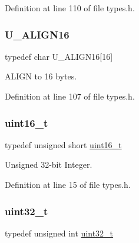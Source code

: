 Definition at line 110 of file types.\+h.

\mbox{\label{a00140_a9093ff6c6894ca213db42a2d686d0ad6_a9093ff6c6894ca213db42a2d686d0ad6}} 
\subsubsection{\texorpdfstring{U\+\_\+\+A\+L\+I\+G\+N16}{U\_ALIGN16}}
{\footnotesize\ttfamily typedef char U\+\_\+\+A\+L\+I\+G\+N16\mbox{[}16\mbox{]}}



A\+L\+I\+GN to 16 bytes. 



Definition at line 107 of file types.\+h.

\mbox{\label{a00140_a273cf69d639a59973b6019625df33e30_a273cf69d639a59973b6019625df33e30}} 
\subsubsection{\texorpdfstring{uint16\+\_\+t}{uint16\_t}}
{\footnotesize\ttfamily typedef unsigned short \hyperlink{a00140_a273cf69d639a59973b6019625df33e30_a273cf69d639a59973b6019625df33e30}{uint16\+\_\+t}}



Unsigned 32-\/bit Integer. 



Definition at line 15 of file types.\+h.

\mbox{\label{a00140_a435d1572bf3f880d55459d9805097f62_a435d1572bf3f880d55459d9805097f62}} 
\subsubsection{\texorpdfstring{uint32\+\_\+t}{uint32\_t}}
{\footnotesize\ttfamily typedef unsigned int \hyperlink{a00140_a435d1572bf3f880d55459d9805097f62_a435d1572bf3f880d55459d9805097f62}{uint32\+\_\+t}}



